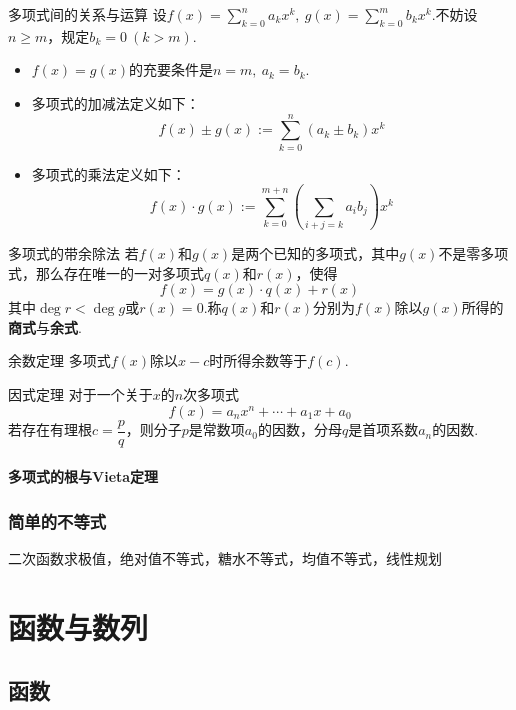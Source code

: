 \documentclass[lang=cn, zihao=5]{elegantbook}
\newcommand{\ssb}[1]{\left( #1 \right)}
\begin{document}
\begin{definition}{多项式间的关系与运算}
	设$f(x) = \sum_{k=0}^{n}a_kx^k,~g(x) = \sum_{k=0}^{m}b_kx^k$.不妨设$n \geq m$，规定$b_k=0~(k > m)$.
	\begin{itemize}
		\item $f(x)=g(x)$的充要条件是$n=m,~a_k=b_k$.
		\item 多项式的加减法定义如下：$$f(x) \pm g(x) := \sum_{k=0}^{n} (a_k \pm b_k)x^{k}$$
		\item 多项式的乘法定义如下：$$f(x) \cdot g(x) := \sum_{k=0}^{m+n} \ssb{\sum_{i+j=k}a_ib_j}x^k$$
	\end{itemize}
\end{definition}

\begin{proposition}{多项式的带余除法}
	若$f(x)$和$g(x)$是两个已知的多项式，其中$g(x)$不是零多项式，那么存在唯一的一对多项式$q(x)$和$r(x)$，使得$$f(x) = g(x) \cdot q(x) + r(x)$$其中$\deg r < \deg g$或$r(x)=0$.称$q(x)$和$r(x)$分别为$f(x)$除以$g(x)$所得的\textbf{商式}与\textbf{余式}.
\end{proposition}

\begin{theorem}{余数定理}
	多项式$f(x)$除以$x-c$时所得余数等于$f(c)$.
\end{theorem}

\begin{theorem}{因式定理}
    对于一个关于$x$的$n$次多项式$$f(x)=a_nx^n+ \cdots +a_1x+a_0$$若存在有理根$c=\dfrac{p}{q}$，则分子$p$是常数项$a_0$的因数，分母$q$是首项系数$a_n$的因数.
\end{theorem}

\subsection{多项式的根与Vieta定理}

\section{简单的不等式}

二次函数求极值，绝对值不等式，糖水不等式，均值不等式，线性规划

\part{函数与数列}

\chapter{函数}
\end{document}

